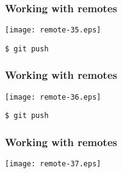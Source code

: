 \documentclass[english]{beamer}
\newcommand{\CMD}[1]{%
\texttt{\textcolor{code-blue}{#1}}%
}
\begin{document}
\begin{frame}[fragile]
\frametitle{Working with remotes}

\texttt{[image: remote-35.eps]}

\begin{center}
\CMD{\$ git push}
\end{center}

\vspace{\textheight}
\end{frame}

\begin{frame}[fragile]
\frametitle{Working with remotes}

\texttt{[image: remote-36.eps]}

\begin{center}
\CMD{\$ git push}
\end{center}

\vspace{\textheight}
\end{frame}

\begin{frame}[fragile]
\frametitle{Working with remotes}

\texttt{[image: remote-37.eps]}

\vspace{\textheight}
\end{frame}
\end{document}
